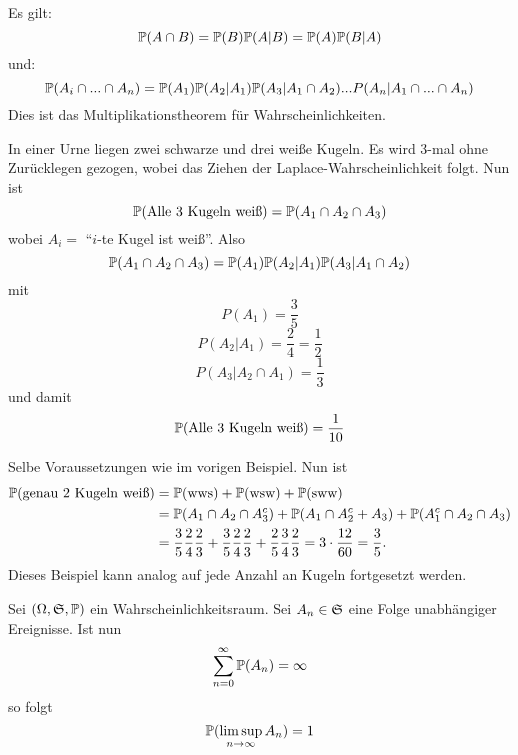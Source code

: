 			\begin{bem}
				Es gilt:
				\[ \P(A\cap B)=\P(B)\P(A|B)=\P(A)\P(B|A) \]
				und:
				\[ \P(A_i\cap...\cap A_n)=\P(A_1)\P(A_2|A_1)\P(A_3|A_1\cap A_2)...P(A_n|A_1\cap...\cap A_n) \]
				Dies ist das Multiplikationstheorem für Wahrscheinlichkeiten. 
			\end{bem}
			
			\begin{bsp}
				In einer Urne liegen zwei schwarze und drei weiße Kugeln. Es wird 3-mal ohne Zurücklegen gezogen, wobei das Ziehen der Laplace-Wahrscheinlichkeit folgt. Nun ist
				\[ \P(\text{Alle 3 Kugeln weiß})=\P(A_1\cap A_2\cap A_3) \]
				wobei $A_i=$ "`$i$-te Kugel ist weiß"'. Also
				\[ \P(A_1\cap A_2\cap A_3)=\P(A_1)\P(A_2| A_1)\P(A_3|A_1\cap A_2) \]
				mit
				\[ P(A_1)=\frac{3}{5} \]
				\[ P(A_2| A_1)=\frac{2}{4}=\frac{1}{2} \]
				\[ P(A_3|A_2\cap A_1)=\frac{1}{3} \]
				und damit 
				\[ \P(\text{Alle 3 Kugeln weiß})=\frac{1}{10} \]
			\end{bsp}
			
			\begin{bsp}
				Selbe Voraussetzungen wie im vorigen Beispiel. Nun ist
				\begin{align*}
				\P(\text{genau 2 Kugeln weiß})&=\P(\text{wws})+\P(\text{wsw})+\P(\text{sww})\\
				&=\P(A_1\cap A_2\cap A_3^c)+\P(A_1\cap A_2^c+A_3)+\P(A_1^c\cap A_2 \cap A_3)\\
				&=\frac{3}{5}\frac{2}{4}\frac{2}{3}+\frac{3}{5}\frac{2}{4}\frac{2}{3}+\frac{2}{5}\frac{3}{4}\frac{2}{3}=3\cdot\frac{12}{60}=\frac{3}{5}.
				\end{align*}
				Dieses Beispiel kann analog auf jede Anzahl an Kugeln fortgesetzt werden.
			\end{bsp}
			
			\begin{satz}
				Sei $(\Omega, \ms{S}, \P)$ ein Wahrscheinlichkeitsraum. Sei $A_n\in\ms{S}$ eine Folge unabhängiger Ereignisse. \newline
				Ist nun 
				\[ \sum_{n=0}^\infty \P(A_n)=\infty \]
				so folgt
				\[ \P(\limsup_{n\to\infty} A_n)=1 \]
			\end{satz}
			
